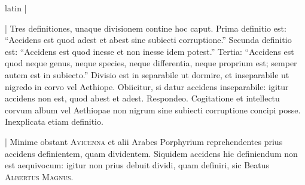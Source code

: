 \begin{otherlanguage*}{latin}
\pstart
  \textnormal{|}  
\pend

        \pstart
        \pend
      
\pstart
\noindent%
  \textnormal{|} Tres definitiones, unaque divisionem contine hoc caput. Prima definitio est: \enquote{Accidens est quod adest et abest sine subiecti corruptione.} Secunda definitio est: \enquote{Accidens est quod inesse et non inesse idem potest.} Tertia: \enquote{Accidens est quod neque genus, neque species, neque differentia, neque proprium est; semper autem est in subiecto.} Divisio est in separabile ut dormire, et inseparabile ut nigredo in corvo vel Aethiope. Obiicitur, si datur accidens inseparabile: igitur accidens non est, quod abest et adest. Respondeo. Cogitatione et intellectu corvum album vel Aethiopae non nigrum sine subiecti corruptione concipi posse. Inexplicata etiam definitio. 
\pend

        \pstart
        \pend
      
\pstart
\noindent%
  \textnormal{|} Minime obstant \textsc{Avicenna} et alii Arabes Porphyrium reprehendentes prius accidens definientem, quam dividentem. Siquidem accidens hic definiendum non est aequivocum: igitur non prius debuit dividi, quam definiri, sic Beatus \textsc{Albertus Magnus}. 
\pend


\end{otherlanguage*}
